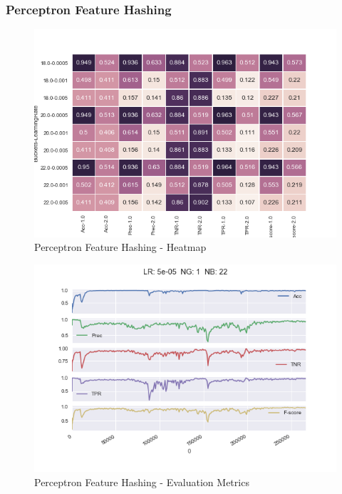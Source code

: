 \documentclass[12pt]{article}
\begin{document}
\subsubsection{Perceptron Feature Hashing}

\begin{figure}[h]
    \centering
    \includegraphics[scale=0.8]{./SpamFilter/code/pfh}
    \caption{Perceptron Feature Hashing - Heatmap}
    \label{pfhhm}
\end{figure}

\begin{figure}[h]
    \centering
    \includegraphics[scale=0.8]{./SpamFilter/code/pfhcurve}
    \caption{Perceptron Feature Hashing - Evaluation Metrics}
    \label{pfhc}
\end{figure}
\end{document}
